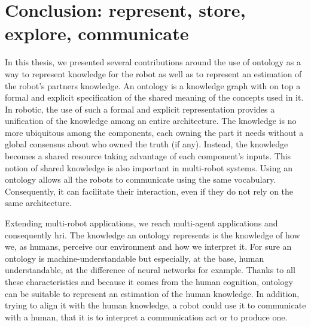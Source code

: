 \chapter*{Conclusion: represent, store, explore, communicate}

%
%
%

In this thesis, we presented several contributions around the use of ontology as a way to represent knowledge for the robot as well as to represent an estimation of the robot's partners knowledge. An ontology is a knowledge graph with on top a formal and explicit specification of the shared meaning of the concepts used in it. In robotic, the use of such a formal and explicit representation provides a unification of the knowledge among an entire architecture. The knowledge is no more ubiquitous among the components, each owning the part it needs without a global consensus about who owned the truth (if any). Instead, the knowledge becomes a shared resource taking advantage of each component's inputs. This notion of shared knowledge is also important in multi-robot systems. Using an ontology allows all the robots to communicate using the same vocabulary. Consequently, it can facilitate their interaction, even if they do not rely on the same architecture.

Extending multi-robot applications, we reach multi-agent applications and consequently \acrfull{hri}. The knowledge an ontology represents is the knowledge of how we, as humans, perceive our environment and how we interpret it. For sure an ontology is machine-understandable but especially, at the base, human understandable, at the difference of neural networks for example. Thanks to all these characteristics and because it comes from the human cognition, ontology can be suitable to represent an estimation of the human knowledge. In addition, trying to align it with the human knowledge, a robot could use it to communicate with a human, that it is to interpret a communication act or to produce one.

